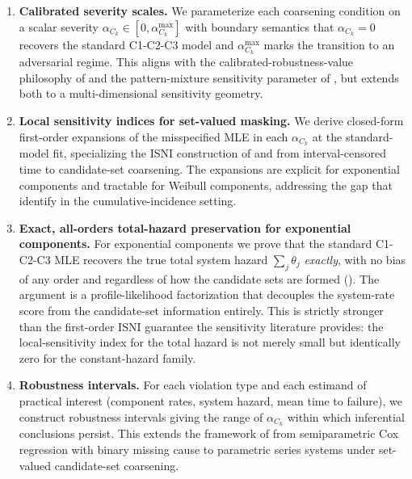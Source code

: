 \begin{enumerate}
    \item \textbf{Calibrated severity scales.} We parameterize each
        coarsening condition on a scalar severity
        $\alpha_{C_k} \in [0, \alpha_{C_k}^{\max}]$ with boundary semantics
        that $\alpha_{C_k} = 0$ recovers the standard C1-C2-C3 model and
        $\alpha_{C_k}^{\max}$ marks the transition to an adversarial regime.
        This aligns with the calibrated-robustness-value philosophy of
        \citet{CinelliHazlett2020} and the pattern-mixture sensitivity
        parameter of \citet{MorenoBetancur2015}, but extends both to a
        multi-dimensional sensitivity geometry.

    \item \textbf{Local sensitivity indices for set-valued masking.} We
        derive closed-form first-order expansions of the misspecified MLE in
        each $\alpha_{C_k}$ at the standard-model fit, specializing the ISNI
        construction of \citet{TroxelMaHeitjan2004} and
        \citet{ZhangHeitjan2006} from interval-censored time to
        candidate-set coarsening. The expansions are explicit for
        exponential components and tractable for Weibull components,
        addressing the gap that \citet{Bakoyannis2025} identify in the
        cumulative-incidence setting.

    \item \textbf{Exact, all-orders total-hazard preservation for
        exponential components.} For exponential components we prove that
        the standard C1-C2-C3 MLE recovers the true total system hazard
        $\sum_j \theta_j$ \emph{exactly}, with no bias of any order and
        regardless of how the candidate sets are formed
        (). The argument is a profile-likelihood
        factorization that decouples the system-rate score from the
        candidate-set information entirely. This is strictly stronger than
        the first-order ISNI guarantee \citep{TroxelMaHeitjan2004} the
        sensitivity literature provides: the local-sensitivity index for
        the total hazard is not merely small but identically zero for the
        constant-hazard family.

    \item \textbf{Robustness intervals.} For each violation type and each
        estimand of practical interest (component rates, system hazard,
        mean time to failure), we construct robustness intervals giving the
        range of $\alpha_{C_k}$ within which inferential conclusions
        persist. This extends the framework of \citet{Bakoyannis2025} from
        semiparametric Cox regression with binary missing cause to
        parametric series systems under set-valued candidate-set
        coarsening.


\end{enumerate}
